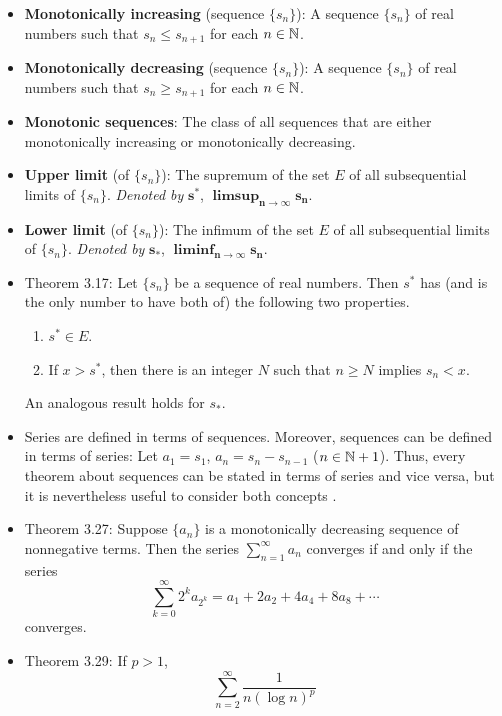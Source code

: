 \documentclass[../../notes.tex]{subfiles}
\begin{document}
\begin{itemize}
\begin{itemize}
    \end{itemize}
    \item \textbf{Monotonically increasing} (sequence $\{s_n\}$): A sequence $\{s_n\}$ of real numbers such that $s_n\leq s_{n+1}$ for each $n\in\mathbb{N}$.
    \item \textbf{Monotonically decreasing} (sequence $\{s_n\}$): A sequence $\{s_n\}$ of real numbers such that $s_n\geq s_{n+1}$ for each $n\in\mathbb{N}$.
    \item \textbf{Monotonic sequences}: The class of all sequences that are either monotonically increasing or monotonically decreasing.
    \item \textbf{Upper limit} (of $\{s_n\}$): The supremum of the set $E$ of all subsequential limits of $\{s_n\}$. \emph{Denoted by} $\bm{s^*}$, $\bm{\limsup_{n\to\infty}s_n}$.
    \item \textbf{Lower limit} (of $\{s_n\}$): The infimum of the set $E$ of all subsequential limits of $\{s_n\}$. \emph{Denoted by} $\bm{s_*}$, $\bm{\liminf_{n\to\infty}s_n}$.
    \item Theorem 3.17: Let $\{s_n\}$ be a sequence of real numbers. Then $s^*$ has (and is the only number to have both of) the following two properties.
    \begin{enumerate}[label={(\alph*)}]
        \item $s^*\in E$.
        \item If $x>s^*$, then there is an integer $N$ such that $n\geq N$ implies $s_n<x$.
    \end{enumerate}
    An analogous result holds for $s_*$.
    \item {}Series are defined in terms of sequences. Moreover, sequences can be defined in terms of series: Let $a_1=s_1$, $a_n=s_n-s_{n-1}$ ($n\in\mathbb{N}+1$). Thus, every theorem about sequences can be stated in terms of series and vice versa, but it is nevertheless useful to consider both concepts \parencite[59]{bib:Rudin}.
    \item Theorem 3.27: Suppose $\{a_n\}$ is a monotonically decreasing sequence of nonnegative terms. Then the series $\sum_{n=1}^\infty a_n$ converges if and only if the series
    \begin{equation*}
        \sum_{k=0}^\infty 2^ka_{2^k} = a_1+2a_2+4a_4+8a_8+\cdots
    \end{equation*}
    converges.
    \item Theorem 3.29: If $p>1$,
    \begin{equation*}
        \sum_{n=2}^\infty\frac{1}{n(\log n)^p}

\end{equation*}
\end{itemize}
\end{document}
